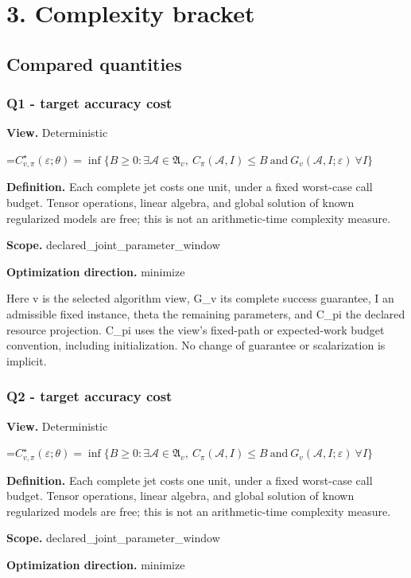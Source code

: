 \documentclass[10pt,a4paper]{article}
\newcommand{\AtlasMath}[1]{\par\begingroup\centering\setbox0=\hbox{$\displaystyle #1$}\ifdim\wd0>1.4\linewidth\typeout{ATLAS WIDE FORMULA: \the\wd0}\fi\ifdim\wd0>\linewidth\resizebox{\linewidth}{!}{\box0}\else\box0\fi\par\endgroup}
\begin{document}
\section{3. Complexity bracket}
\subsection{Compared quantities}
\subsubsection{Q1 - target accuracy cost}
\textbf{View.} Deterministic

\AtlasMath{C^\star_{v,\pi}(\varepsilon;\theta)=\inf\{B\ge0:\exists\mathcal A\in\mathfrak A_v,\ C_\pi(\mathcal A,I)\le B\ \text{and}\ G_v(\mathcal A,I;\varepsilon)\ \forall I\}}
\textbf{Definition.} Each complete jet costs one unit, under a fixed worst-case call budget. Tensor operations, linear algebra, and global solution of known regularized models are free; this is not an arithmetic-time complexity measure.

\textbf{Scope.} declared\_joint\_parameter\_window

\textbf{Optimization direction.} minimize

Here v is the selected algorithm view, G\_v its complete success guarantee, I an admissible fixed instance, theta the remaining parameters, and C\_pi the declared resource projection. C\_pi uses the view's fixed-path or expected-work budget convention, including initialization. No change of guarantee or scalarization is implicit.

\subsubsection{Q2 - target accuracy cost}
\textbf{View.} Deterministic

\AtlasMath{C^\star_{v,\pi}(\varepsilon;\theta)=\inf\{B\ge0:\exists\mathcal A\in\mathfrak A_v,\ C_\pi(\mathcal A,I)\le B\ \text{and}\ G_v(\mathcal A,I;\varepsilon)\ \forall I\}}
\textbf{Definition.} Each complete jet costs one unit, under a fixed worst-case call budget. Tensor operations, linear algebra, and global solution of known regularized models are free; this is not an arithmetic-time complexity measure.

\textbf{Scope.} declared\_joint\_parameter\_window

\textbf{Optimization direction.} minimize
\end{document}
